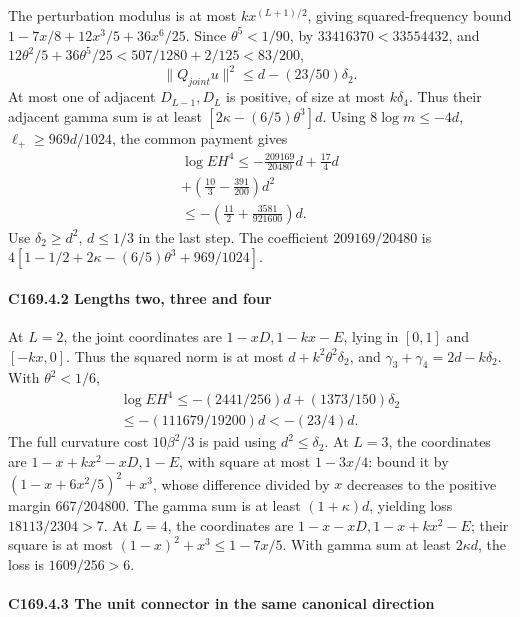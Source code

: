 The perturbation modulus is at most \(kx^{(L+1)/2}\), giving squared-frequency bound \(1-7x/8+12x^3/5+36x^6/25\). Since \(\theta^5<1/90\), by \(33416370<33554432\), and \(12\theta^2/5+36\theta^5/25<507/1280+2/125<83/200\),
\[
\|Q_{joint}u\|^2\le d-(23/50)\delta_2.                        \tag{C169.4.3}
\]
At most one of adjacent \(D_{L-1},\allowbreak \allowbreak  D_L\) is positive, of size at most \(k\delta_4\). Thus their adjacent gamma sum is at least \([2\kappa-(6/5)\theta^3]d\). Using \(8\log m\le-4d\), \(\ell_+\ge969d/1024\), the common payment gives
\[
\begin{gathered}
\log EH^4\le-\frac{209169}{20480}d+\frac{17}{4}d\\
+\left(\frac{10}{3}-\frac{391}{200}\right)d^2\\
\le-\left(\frac{11}{2}+\frac{3581}{921600}\right)d.
\end{gathered}\tag{C169.4.4}
\]
Use \(\delta_2\ge d^2\), \(d\le1/3\) in the last step. The coefficient \(209169/20480\) is \(4[1-1/2+2\kappa-(6/5)\theta^3+969/1024]\).

\paragraph{C169.4.2 Lengths two, three and four}

At \(L=2\), the joint coordinates are \(1-xD,\allowbreak \allowbreak  1-kx-E\), lying in \([0,\allowbreak \allowbreak  1]\) and \([-kx,\allowbreak \allowbreak  0]\). Thus the squared norm is at most \(d+k^2\theta^2\delta_2\), and \(\gamma_3+\gamma_4=2d-k\delta_2\). With \(\theta^2<1/6\),
\[
\begin{gathered}
\log EH^4\le-(2441/256)d+(1373/150)\delta_2\\
\le-(111679/19200)d<-(23/4)d.
\end{gathered}\tag{C169.4.5}
\]
The full curvature cost \(10\beta^2/3\) is paid using \(d^2\le \delta_2\). At \(L=3\), the coordinates are \(1-x+kx^2-xD,\allowbreak \allowbreak  1-E\), with square at most \(1-3x/4\): bound it by \((1-x+6x^2/5)^2+x^3\), whose difference divided by \(x\) decreases to the positive margin \(667/204800\). The gamma sum is at least \((1+\kappa)d\), yielding loss \(18113/2304>7\). At \(L=4\), the coordinates are \(1-x-xD,\allowbreak \allowbreak  1-x+kx^2-E\); their square is at most \((1-x)^2+x^3\le1-7x/5\). With gamma sum at least \(2\kappa d\), the loss is \(1609/256>6\).

\paragraph{C169.4.3 The unit connector in the same canonical direction}

